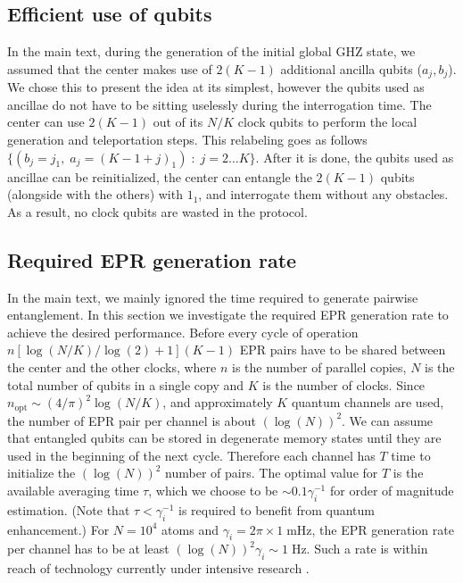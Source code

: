 \subsection{Efficient use of qubits}
In the main text, during the generation of the initial global GHZ state, we
assumed that the center makes use of $2(K-1)$ additional ancilla qubits ($a_j,
b_j$).
We chose this to present the idea at its simplest, however the qubits used as
ancillae do not have to be sitting uselessly during the interrogation time.
The center can use $2(K-1)$ out of its $N/K$ clock qubits to perform the local
generation and teleportation steps. This relabeling goes as follows $\{(b_j=
j_1,\; a_j=(K-1+j)_1)\;:\; j=2\dots K\}$.
After it is done, the qubits used as ancillae can be reinitialized, the center
can entangle the $2(K-1)$ qubits (alongside with the others) with $1_1$, and
interrogate them without any obstacles. As a result, no clock qubits are wasted
in the protocol.


\subsection{Required EPR generation rate}
 In the main text, we mainly ignored the time required to generate
 pairwise entanglement. In this section we investigate the required EPR
 generation rate to achieve the desired performance.
 Before every cycle of operation $n [\log(N/K)/\log(2) + 1] (K-1)$ EPR pairs
have to be shared between the center and the other clocks, where $n$ is the
number of parallel copies, $N$ is the total number of qubits in a single copy
and $K$ is the number of clocks.
Since $n_\mathrm{opt} \sim (4/\pi)^2 \log(N/K)$, and approximately $K$
quantum channels are used, the number of EPR pair per channel is about
$(\log(N))^2$. We can assume that entangled qubits can be stored in degenerate
memory states until they are used in the beginning of the next cycle. Therefore
each channel has $T$ time to initialize the $(\log(N))^2$ number of pairs. The
optimal value for $T$ is the available averaging time $\tau$, which we choose to
be $\sim 0.1\gamma_i^{-1}$ for order of magnitude estimation. (Note that $\tau <
\gamma_i^{-1}$ is required to benefit from quantum enhancement.) For $N=10^4$
atoms and $\gamma_i=2\pi \times 1 \;\mathrm{mHz}$, the EPR generation rate per
channel has to be at least $(\log(N))^2\gamma_i \sim 1\;\mathrm{Hz}$.
Such a rate is within reach of technology currently under intensive research 
\cite{monroe2014}.




